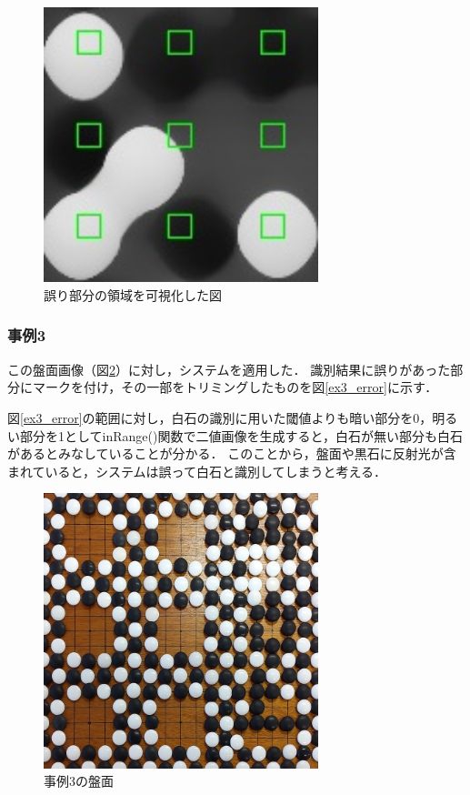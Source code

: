 \documentclass[openright]{nitocs}
\numberwithin{equation}{section}
\begin{document}
                \begin{figure}[tb] %
                    \begin{center}
                    \includegraphics[clip,width=80mm]{DSC_0099/TRIM_boardWithAreaImg.jpg} 
                    \caption{誤り部分の領域を可視化した図}
                    \label{ex2_error_area}
                    \end{center}
                \end{figure}

            \subsubsection{事例3} %
                この盤面画像（図\ref{ex3}）に対し，システムを適用した．
                識別結果に誤りがあった部分にマークを付け，その一部をトリミングしたものを図\ref{ex3_error}に示す．

                図\ref{ex3_error}の範囲に対し，白石の識別に用いた閾値よりも暗い部分を0，明るい部分を1としてinRange()関数で二値画像を生成すると，白石が無い部分も白石があるとみなしていることが分かる．
                このことから，盤面や黒石に反射光が含まれていると，システムは誤って白石と識別してしまうと考える．
                \begin{figure}[tb] %
                    \begin{center}
                    \includegraphics[clip,width=80mm]{DSC_0098/boardImg.jpg} 
                    \caption{事例3の盤面}
                    \label{ex3}
                    \end{center}
                \end{figure}
\end{document}
